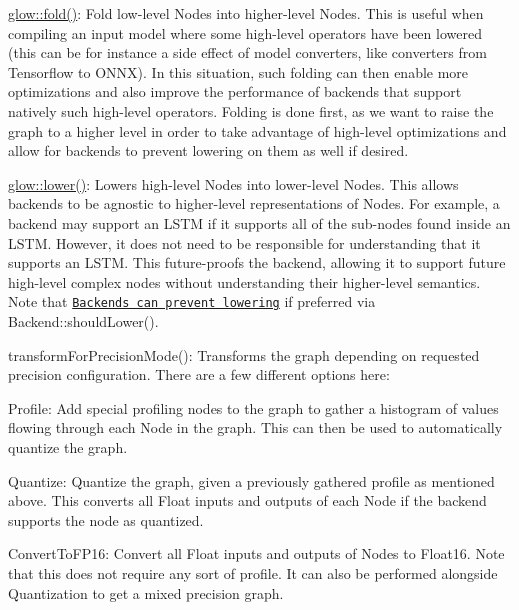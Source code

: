 \begin{DoxyItemize}
\item {\ttfamily \hyperlink{namespaceglow_a1af90308823b5fb36b860a8a73aaa923}{glow\+::fold()}}\+: Fold low-\/level Nodes into higher-\/level Nodes. This is useful when compiling an input model where some high-\/level operators have been lowered (this can be for instance a side effect of model converters, like converters from Tensorflow to O\+N\+NX). In this situation, such folding can then enable more optimizations and also improve the performance of backends that support natively such high-\/level operators. Folding is done first, as we want to raise the graph to a higher level in order to take advantage of high-\/level optimizations and allow for backends to prevent lowering on them as well if desired.
\item {\ttfamily \hyperlink{namespaceglow_a0069e8261c2e2ddf94d4697de80150ad}{glow\+::lower()}}\+: Lowers high-\/level Nodes into lower-\/level Nodes. This allows backends to be agnostic to higher-\/level representations of Nodes. For example, a backend may support an L\+S\+TM if it supports all of the sub-\/nodes found inside an L\+S\+TM. However, it does not need to be responsible for understanding that it supports an L\+S\+TM. This future-\/proofs the backend, allowing it to support future high-\/level complex nodes without understanding their higher-\/level semantics. Note that \href{Backends.md#backend-abstract-class}{\tt Backends can prevent lowering} if preferred via {\ttfamily Backend\+::should\+Lower()}.
\item {\ttfamily transform\+For\+Precision\+Mode()}\+: Transforms the graph depending on requested precision configuration. There are a few different options here\+:
\begin{DoxyItemize}
\item {\ttfamily Profile}\+: Add special profiling nodes to the graph to gather a histogram of values flowing through each Node in the graph. This can then be used to automatically quantize the graph.
\item {\ttfamily Quantize}\+: Quantize the graph, given a previously gathered profile as mentioned above. This converts all Float inputs and outputs of each Node if the backend supports the node as quantized.
\item {\ttfamily Convert\+To\+F\+P16}\+: Convert all Float inputs and outputs of Nodes to Float16. Note that this does not require any sort of profile. It can also be performed alongside Quantization to get a mixed precision graph.

\end{DoxyItemize}
\end{DoxyItemize}
